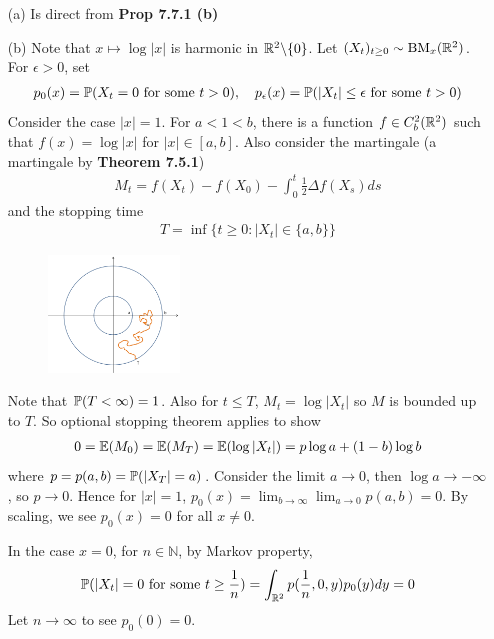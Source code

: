 \documentclass[12pt,a4paper]{report}
\newenvironment{proof}
{\begin{changemargin}{1cm}{0.5cm} 
	}%
	{\end{changemargin}
}
\begin{document}
\begin{proof}
\pf \begin{itemize}
\item[(a)] Is direct from \textbf{Prop 7.7.1 (b)}\\
\item[(b)] Note that $x\mapsto \log |x|$ is harmonic in $\mathbb{R}^2 \backslash \{0\}$. Let $(X_t)_{t\geq 0} \sim \text{BM}_x(\mathbb{R}^2)$. For $\epsilon >0$, set 
\begin{align*}
p_0(x) = \mathbb{P}(X_t =0 \text{ for some }t>0 ), \quad p_{\epsilon}(x) = \mathbb{P}(|X_t| \leq \epsilon \text{ for some } t>0)
\end{align*}
Consider the case $|x|=1$. For $a<1<b$, there is a function $f\in C_b^2 (\mathbb{R}^2)$ such that $f(x) = \log |x|$ for $|x| \in [a,b]$. Also consider the martingale (a martingale by \textbf{Theorem 7.5.1})
\begin{align*}
M_t = f(X_t) - f(X_0) - \int_0^t \frac{1}{2} \Delta f(X_s) ds
\end{align*}
and the stopping time
\begin{align*}
T = \inf \{ t\geq 0 : |X_t| \in \{ a,b\} \}
\end{align*}
\begin{figure}[h]
	\centering
	\includegraphics[width=0.33\textwidth]{2}
\end{figure}
Note that $\mathbb{P} (T< \infty ) =1$. Also for $t\leq T$, $M_t = \log |X_t|$ so $M$ is bounded up to $T$. So optional stopping theorem applies to show
\begin{align*}
0 = \mathbb{E} (M_0) = \mathbb{E}(M_T) = \mathbb{E}( \log |X_t|) = p\log a + (1-b) \log b
\end{align*}
where $p = p(a,b) =\mathbb{P} (|X_T| =a)$. Consider the limit $a\rightarrow 0$, then $\log a \rightarrow -\infty$, so $p\rightarrow 0$. Hence for $|x|=1$, $p_0(x) = \lim_{b\rightarrow \infty} \lim_{a\rightarrow 0} p(a,b) =0$. By scaling, we see $p_0(x) =0$ for all $x\neq 0$.

\quad In the case $x=0$, for $n\in \mathbb{N}$, by Markov property,
\begin{align*}
\mathbb{P} (|X_t| =0 \text{ for some }  t \geq \frac{1}{n}) = \int_{\mathbb{R}^2} p(\frac{1}{n},0,y) p_0(y) dy =0
\end{align*} 
Let $n\rightarrow \infty$ to see $p_0(0) =0$.
\s


\end{itemize}
\end{proof}
\end{document}
